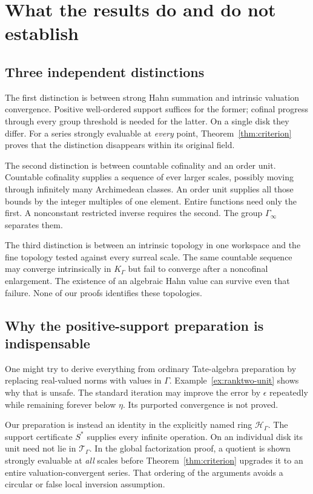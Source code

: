 \documentclass[11pt,letterpaper]{article}
\numberwithin{equation}{section}
\theoremstyle{definition}
\theoremstyle{remark}
\begin{document}
\section{What the results do and do not establish}\label{sec:scope}

\subsection{Three independent distinctions}
The first distinction is between strong Hahn summation and intrinsic valuation
convergence. Positive well-ordered support suffices for the former; cofinal
progress through every group threshold is needed for the latter. On a single
disk they differ. For a series strongly evaluable at \emph{every} point,
Theorem~\ref{thm:criterion} proves that the distinction disappears within
its original field.

The second distinction is between countable cofinality and an order unit.
Countable cofinality supplies a sequence of ever larger scales, possibly
moving through infinitely many Archimedean classes. An order unit supplies
all those bounds by the integer multiples of one element. Entire functions
need only the first. A nonconstant restricted inverse requires the second.
The group $\Gamma_\infty$ separates them.

The third distinction is between an intrinsic topology in one workspace and
the fine topology tested against every surreal scale. The same countable
sequence may converge intrinsically in $K_\Gamma$ but fail to converge after
a noncofinal enlargement. The existence of an algebraic Hahn value can
survive even that failure. None of our proofs identifies these topologies.

\subsection{Why the positive-support preparation is indispensable}
One might try to derive everything from ordinary Tate-algebra preparation by
replacing real-valued norms with values in $\Gamma$. Example~\ref{ex:ranktwo-unit}
shows why that is unsafe. The standard iteration may improve the error by
$\epsilon$ repeatedly while remaining forever below $\eta$. Its purported
convergence is not proved.

Our preparation is instead an identity in the explicitly named ring
$\mathcal H_\Gamma$. The support certificate $S^*$ supplies every infinite
operation. On an individual disk its unit need not lie in
$\mathcal T_\Gamma$. In the global factorization proof, a quotient is shown
strongly evaluable at \emph{all} scales before Theorem~\ref{thm:criterion}
upgrades it to an entire valuation-convergent series. That ordering of the
arguments avoids a circular or false local inversion assumption.
\end{document}
